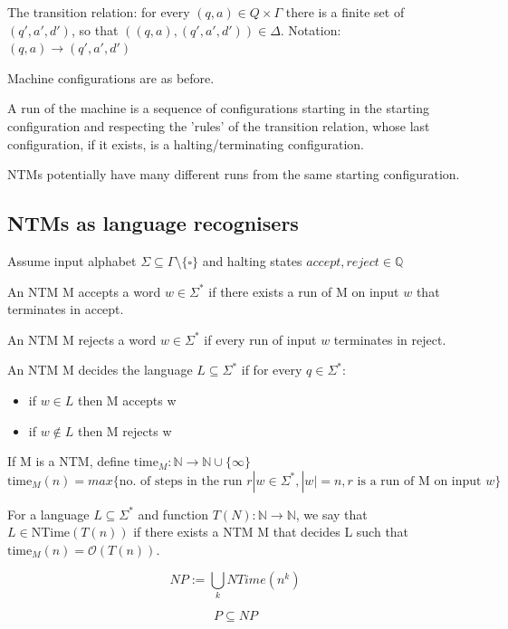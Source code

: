 \documentclass[a4paper,12pt]{article}
\theoremstyle{definition}
\theoremstyle{remark}
\newcommand{\N}{\mathbb{N}}
\newcommand{\Q}{\mathbb{Q}}
\begin{document}
The transition relation: for every $(q, a) \in Q \times \Gamma$ there is a finite set of $(q', a', d')$, so that
$((q, a), (q', a', d')) \in \Delta$. Notation: $(q, a) \to (q', a', d')$

Machine configurations are as before.

A run of the machine is a sequence of configurations starting in the starting configuration and respecting the 'rules' of the 
transition relation, whose last configuration, if it exists, is a halting/terminating configuration.

NTMs potentially have many different runs from the same starting configuration.


\subsection{NTMs as language recognisers}

Assume input alphabet $\Sigma \subseteq \Gamma \setminus \{\square\}$ and halting states $accept, reject \in \Q$

An NTM M accepts a word $w \in \Sigma^*$ if there exists a run of M on input $w$ that terminates in accept.

An NTM M rejects a word $w \in \Sigma^*$ if every run of input $w$ terminates in reject.

An NTM M decides the language $L \subseteq \Sigma^*$ if for every $q \in \Sigma^*$:
\begin{itemize}
    \item if $w \in L$ then M accepts w
    \item if $w \notin L$ then M rejects w
\end{itemize}


If M is a NTM, define $\text{time}_M: \N \to \N \cup \{\infty\}$
\begin{dmath*}
    \text{time}_M(n) = max \{\text{no. of steps in the run } r | w \in \Sigma^*, |w| = n, r \text{ is a run of M on input } w\}
\end{dmath*}

For a language $L \subseteq \Sigma^*$ and function $T(N): \N \to \N$, we say that $L \in \text{NTime}(T(n))$ if there exists a NTM M
that decides L such that $\text{time}_M(n) = \mathscr{O}(T(n))$.

\begin{equation*}
    NP := \bigcup\limits_{k} NTime(n^k)
\end{equation*}

\begin{equation*}
    P \subseteq NP
\end{equation*}
\end{document}
